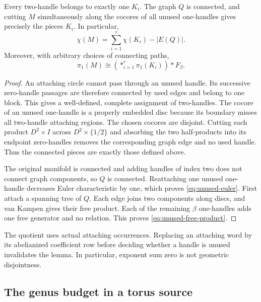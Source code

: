 \begin{lemma}
\label{lem:unused-decomposition}
Every two-handle belongs to exactly one $K_i$.  The graph $Q$ is connected,
and cutting $M$ simultaneously along the cocores of all unused one-handles
gives precisely the pieces $K_i$.  In particular,
\begin{equation}
 \chi(M)=\sum_{i=1}^r\chi(K_i)-|E(Q)|.
 \label{eq:unused-euler}
\end{equation}
Moreover, with arbitrary choices of connecting paths,
\begin{equation}
 \pi_1(M)\cong
 \left(\mathop{\ast}_{i=1}^r\pi_1(K_i)\right)\ast F_\beta.
 \label{eq:unused-free-product}
\end{equation}
\end{lemma}

\begin{proof}
An attaching circle cannot pass through an unused handle.  Its successive
zero-handle passages are therefore connected by used edges and belong to
one block.  This gives a well-defined, complete assignment of two-handles.
The cocore of an unused one-handle is a properly embedded disc because its
boundary misses all two-handle attaching regions.  The chosen cocores are
disjoint.  Cutting each product $D^2\times I$ across $D^2\times\{1/2\}$
and absorbing the two half-products into its endpoint zero-handles removes
the corresponding graph edge and no used handle.  Thus the connected
pieces are exactly those defined above.

The original manifold is connected and adding handles of index two does
not connect graph components, so $Q$ is connected.  Reattaching one unused
one-handle decreases Euler characteristic by one, which proves
\eqref{eq:unused-euler}.  First attach a spanning tree of $Q$.  Each edge
joins two components along discs, and van Kampen gives their free product.
Each of the remaining $\beta$ one-handles adds one free generator and no
relation.  This proves \eqref{eq:unused-free-product}.
\end{proof}

The quotient uses actual attaching occurrences.  Replacing an attaching
word by its abelianized coefficient row before deciding whether a handle
is unused invalidates the lemma.  In particular, exponent sum zero is not
geometric disjointness.

\subsection{The genus budget in a torus source}

